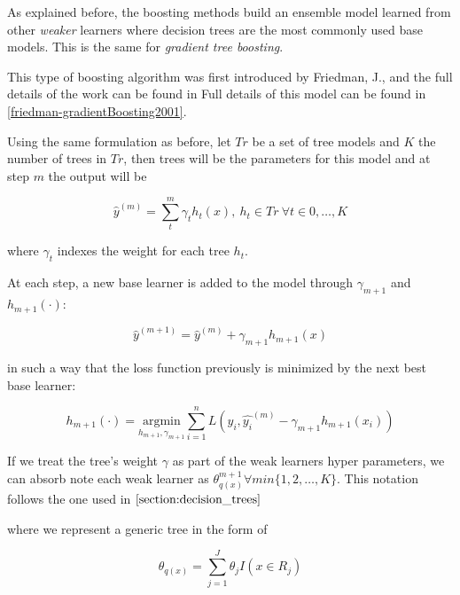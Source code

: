 As explained before, the boosting methods build an ensemble model learned from other \textit{weaker} learners where decision trees are the most commonly used base models.
This is the same for \textit{gradient tree boosting}.

This type of boosting algorithm was first introduced by Friedman, J., and the full details of the work can be found in Full details of this model can be found in \cref{friedman-gradientBoosting2001}.

Using the same formulation as before, let $Tr$ be a set of tree models and $K$ the number of trees in $Tr$, then trees will be the parameters for this model and at step $m$ the output will be

\begin{equation}
\hat{y}^{(m)}= \sum_t^m \gamma_t h_t(x) , \ h_t \in Tr \ \forall t \in {0,\ldots,K}
\end{equation}

where $\gamma_t$ indexes the weight for each tree $h_t$.

At each step, a new base learner is added to the model through $\gamma_{m+1}$ and $h_{m+1}(\cdot)$:

\begin{equation}
\hat{y}^{(m+1)} =  \hat{y}^{(m)} + \gamma_{m+1} h_{m+1}(x)
\end{equation}

in such a way that the loss function previously is minimized by the next best base learner:

\begin{equation}\label{eq:boosting_iterative_minimization}
h_{m+1}(\cdot) = \underset{h_{m+1},\gamma_{m+1}}{\mathrm{argmin}}  \sum_{i=1}^{n} L ( y_i, \hat{y_i}^{(m)} - \gamma_{m+1} h_{m+1}(x_i) )
\end{equation}


If we treat the tree's weight $\gamma$ as part of the weak learners hyper parameters, we can absorb note each weak learner as $\theta^{m+1}_{q(x)} \forall m in \{1,2,\ldots,K \}$.
This notation follows the one used in $\cref{section:decision_trees}$

where we represent a generic tree in the form of

\begin{equation}
\theta_{q(x)} = \sum_{j=1}^J \theta_j I(x \in R_j)
\end{equation}


%


